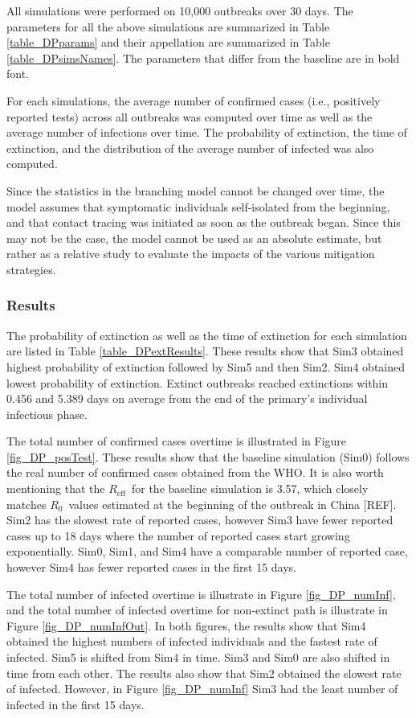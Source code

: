 \documentclass[sr]{drdc-report}
\def\Rz{\ensuremath{R_0}}
\def\Reff{\ensuremath{R_\mathrm{eff}}}
\begin{document}
All simulations were performed on 10,000 outbreaks over 30 days. The parameters for all the above simulations are summarized in Table \ref{table_DPparams} and their appellation are summarized in Table \ref{table_DPsimsNames}. The parameters that differ from the baseline are in bold font.  

For each simulations, the average number of confirmed cases (i.e., positively reported tests) across all outbreaks was computed over time as well as the average number of infections over time. The probability of extinction, the time of extinction, and the distribution of the average number of infected was also computed. 

Since the statistics in the branching model cannot be changed over time, the model assumes that symptomatic individuals self-isolated from the beginning, and that contact tracing was initiated as soon as the outbreak began. Since this may not be the case, the model cannot be used as an absolute estimate, but rather as a relative study to evaluate the impacts of the various mitigation strategies. 

\subsubsection{Results}
The probability of extinction as well as the time of extinction for each simulation are listed in Table \ref{table_DPextResults}. These results show that Sim3 obtained highest probability of extinction followed by Sim5 and then Sim2. Sim4 obtained lowest probability of extinction. Extinct outbreaks reached extinctions within 0.456 and 5.389 days on average from the end of the primary's individual infectious phase. 

The total number of confirmed cases overtime is illustrated in Figure \ref{fig_DP_posTest}. These results show that the baseline simulation (Sim0) follows the real number of confirmed cases obtained from the WHO. It is also worth mentioning that the \Reff\ for the baseline simulation is 3.57, which closely matches \Rz\ values estimated at the beginning of the outbreak in China [REF]. Sim2 has the slowest rate of reported cases, however Sim3 have fewer reported cases up to 18 days where the number of reported cases start growing exponentially. Sim0, Sim1, and Sim4 have a comparable number of reported case, however Sim4 has fewer reported cases in the first 15 days. 

The total number of infected overtime is illustrate in Figure \ref{fig_DP_numInf}, and the total number of infected overtime for non-extinct path is illustrate in Figure \ref{fig_DP_numInfOut}. In both figures, the results show that Sim4 obtained the highest numbers of infected individuals and the fastest rate of infected. Sim5 is shifted from Sim4 in time. Sim3 and Sim0 are also shifted in time from each other. The results also show that Sim2 obtained the slowest rate of infected. However, in Figure \ref{fig_DP_numInf} Sim3 had the least number of infected in the first 15 days. 
\end{document}

